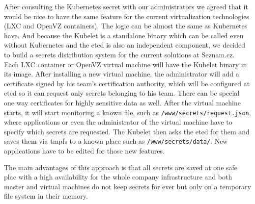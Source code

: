After consulting the Kubernetes secret with our administrators we agreed that it would be nice to have the same feature for the current virtualization technologies (LXC and OpenVZ containers). The logic can be almost the same as Kubernetes have. And because the Kubelet is a standalone binary which can be called even without Kubernetes and the etcd is also an independent component, we decided to build a secrets distribution system for the current solutions at Seznam.cz. Each LXC container or OpenVZ virtual machine will have the Kubelet binary in its image. After installing a new virtual machine, the administrator will add a certificate signed by his team’s certification authority, which will be configured at etcd so it can request only secrets belonging to his team. There can be special one way certificates for highly sensitive data as well. After the virtual machine starts, it will start monitoring a known file, such as \lstinline{/www/secrets/request.json}, where applications or even the administrator of the virtual machine have to specify which secrets are requested. The Kubelet then asks the etcd for them and saves them via tmpfs to a known place such as \lstinline{/www/secrets/data/}. New applications have to be edited for those new features.

The main advantages of this approach is that all secrets are saved at one safe plac with a high availability for the whole company infrastructure and both master and virtual machines do not keep secrets for ever but only on a temporary file system in their memory.
